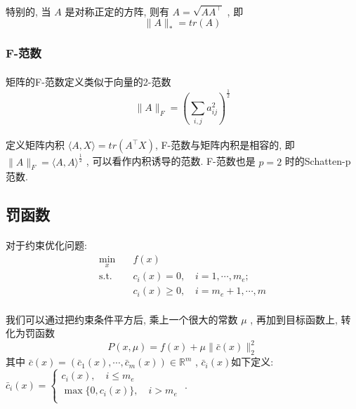 \documentclass[a4paper, UTF8]{ctexart}				%
\numberwithin{equation}{section}				%
\newcommand{\upcite}[1]{\textsuperscript{\textsuperscript{\cite{#1}}}}
\begin{document}
				\paragraph{}
					\quad 特别的, 当 $A$ 是对称正定的方阵, 则有 $ A = \sqrt{A A^\top}$ , 即
					\[
						\lVert{A}\rVert_* = tr(A)
					\]

			\subsubsection{F-范数}
				\paragraph{}
					\quad 矩阵的F-范数定义类似于向量的2-范数\upcite{meyer2000matrix}
					\[
						\lVert{A}\rVert_F = (\sum_{i, j} a_{ij}^2)^{\frac{1}{2}}
					\]

				\paragraph{}
					\quad 定义矩阵内积 $\langle{A, X}\rangle = tr(A^\top X)$, F-范数与矩阵内积是相容的, 即 $\lVert{A}\rVert_F = \langle{A, A}\rangle^{\frac{1}{2}}$ , 可以看作内积诱导的范数. F-范数也是 $p = 2$ 时的Schatten-p范数.

		\subsection{罚函数}
			\paragraph{}
				\quad 对于约束优化问题:
				\begin{equation}
					\begin{split}\label{Q}
						\min_x \quad
							& f(x)\\
						\text{s.t.} \quad
							& c_i(x) = 0, \quad i = 1, \cdots, m_e;\\
							& c_i(x) \ge 0, \quad i = m_e + 1, \cdots, m
					\end{split}
				\end{equation}
			\paragraph{}
				\quad 我们可以通过把约束条件平方后, 乘上一个很大的常数 $\mu$ , 再加到目标函数上, 转化为罚函数\upcite{yuan2008nonliner}
				\begin{equation}
					P(x, \mu) = f(x) + \mu \lVert{\bar{c}(x)}\rVert^2_2
				\end{equation}
				其中
				$
						\bar{c}(x)
					=	(\bar{c}_1(x), \cdots, \bar{c}_m(x))
					\in	\mathbb{R}^{m}
				$ , \quad
				$\bar{c}_i(x)$如下定义:
				$
						\bar{c}_i(x)
					=	\begin{cases}
							c_i(x), \quad i \leq m_e\\
							\max \{0, c_i(x)\}, \quad i > m_e \\
						\end{cases}
				$ .
\end{document}
